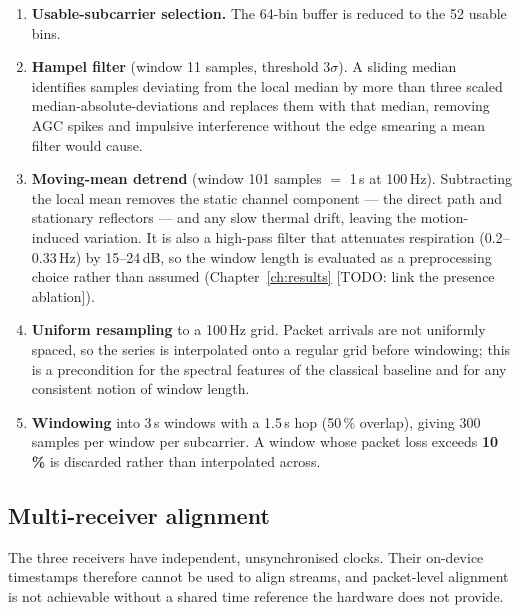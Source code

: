 \begin{enumerate}
  \item \textbf{Usable-subcarrier selection.} The 64-bin buffer is reduced
        to the 52 usable bins.

  \item \textbf{Hampel filter} (window 11 samples, threshold
        $3\sigma$). A sliding median identifies samples deviating from the
        local median by more than three scaled median-absolute-deviations
        and replaces them with that median, removing AGC spikes and
        impulsive interference without the edge smearing a mean filter
        would cause.

  \item \textbf{Moving-mean detrend} (window 101 samples $=$ 1\,s at
        100\,Hz). Subtracting the local mean removes the static channel
        component --- the direct path and stationary reflectors --- and any
        slow thermal drift, leaving the motion-induced variation. It is also
        a high-pass filter that attenuates respiration (0.2--0.33\,Hz) by
        15--24\,dB, so the window length is evaluated as a preprocessing
        choice rather than assumed (Chapter~\ref{ch:results} [TODO: link
        the presence ablation]).

  \item \textbf{Uniform resampling} to a 100\,Hz grid. Packet arrivals are
        not uniformly spaced, so the series is interpolated onto a regular
        grid before windowing; this is a precondition for the spectral
        features of the classical baseline and for any consistent notion of
        window length.

  \item \textbf{Windowing} into 3\,s windows with a 1.5\,s hop (50\,\%
        overlap), giving 300 samples per window per subcarrier. A window
        whose packet loss exceeds \textbf{10\,\%} is discarded rather than
        interpolated across.
\end{enumerate}

\subsection{Multi-receiver alignment}

The three receivers have independent, unsynchronised clocks. Their
on-device timestamps therefore cannot be used to align streams, and
packet-level alignment is not achievable without a shared time reference the
hardware does not provide.

